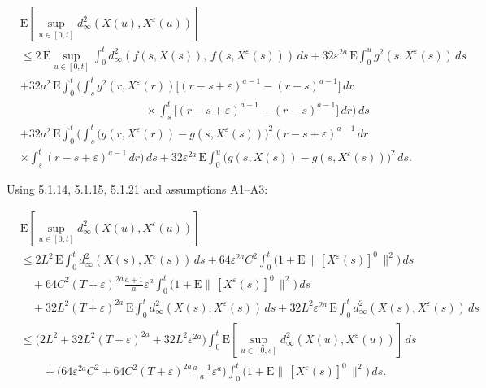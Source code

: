 \documentclass[12pt,a4paper]{report}
\numberwithin{equation}{section}
\begin{document}
\[
\begin{aligned}
&\mathrm{E}\!\left[\sup_{u\in[0,t]} d_{\infty}^{2}\!\left(X(u),X^{\varepsilon}(u)\right)\right] \\
&\le 2\,\mathrm{E}\!\sup_{u\in[0,t]}\int_{0}^{t} d_{\infty}^{2}\!\left(f(s,X(s)),\,f\!\left(s,X^{\varepsilon}(s)\right)\right)\,ds
+ 32\varepsilon^{2a}\,\mathrm{E}\int_{0}^{u} g^{2}\!\left(s,X^{\varepsilon}(s)\right)\,ds \\
&+ 32a^{2}\,\mathrm{E}\int_{0}^{t}\Bigg(\int_{s}^{t} g^{2}\!\left(r,X^{\varepsilon}(r)\right)
\Big[(r-s+\varepsilon)^{a-1}-(r-s)^{a-1}\Big]\,dr \\
&\qquad\qquad\qquad\qquad\qquad\quad \times \int_{s}^{t}\Big[(r-s+\varepsilon)^{a-1}-(r-s)^{a-1}\Big]\,dr\Bigg)\,ds \\
&+ 32a^{2}\,\mathrm{E}\int_{0}^{t}\Bigg(\int_{s}^{t}\Big(g\!\left(r,X^{\varepsilon}(r)\right)-g\!\left(s,X^{\varepsilon}(s)\right)\Big)^{2}
(r-s+\varepsilon)^{a-1}\,dr \\
&\times \int_{s}^{t}(r-s+\varepsilon)^{a-1}\,dr\Bigg)\,ds
+ 32\varepsilon^{2a}\,\mathrm{E}\int_{0}^{u}\Big(g(s,X(s))-g\!\left(s,X^{\varepsilon}(s)\right)\Big)^{2}\,ds .
\end{aligned}
\]

Using 5.1.14, 5.1.15, 5.1.21 and assumptions A1--A3:

\[
\begin{aligned}
&\mathrm{E}\!\left[\sup_{u\in[0,t]} d_{\infty}^{2}\!\left(X(u),X^{\varepsilon}(u)\right)\right] \\
&\le 2L^{2}\,\mathrm{E}\int_{0}^{t} d_{\infty}^{2}\!\left(X(s),X^{\varepsilon}(s)\right)\,ds
+ 64\varepsilon^{2a}C^{2}\int_{0}^{t}\bigl(1+\mathrm{E}\|\,[X^{\varepsilon}(s)]^{0}\,\|^{2}\bigr)\,ds \\
&\quad + 64C^{2}(T+\varepsilon)^{2a}\frac{a+1}{a}\varepsilon^{a}\int_{0}^{t}\bigl(1+\mathrm{E}\|\,[X^{\varepsilon}(s)]^{0}\,\|^{2}\bigr)\,ds \\
&\quad + 32L^{2}(T+\varepsilon)^{2a}\,\mathrm{E}\int_{0}^{t} d_{\infty}^{2}\!\left(X(s),X^{\varepsilon}(s)\right)\,ds
+ 32L^{2}\varepsilon^{2a}\,\mathrm{E}\int_{0}^{t} d_{\infty}^{2}\!\left(X(s),X^{\varepsilon}(s)\right)\,ds \\
&\le \bigl(2L^{2}+32L^{2}(T+\varepsilon)^{2a}+32L^{2}\varepsilon^{2a}\bigr)
\int_{0}^{t}\mathrm{E}\!\left[\sup_{u\in[0,s]} d_{\infty}^{2}\!\left(X(u),X^{\varepsilon}(u)\right)\right]\,ds \\
&\qquad + \bigl(64\varepsilon^{2a}C^{2}+64C^{2}(T+\varepsilon)^{2a}\tfrac{a+1}{a}\varepsilon^{a}\bigr)
\int_{0}^{t}\bigl(1+\mathrm{E}\|\,[X^{\varepsilon}(s)]^{0}\,\|^{2}\bigr)\,ds .
\end{aligned}
\tag{5.1.24}
\]
\end{document}
